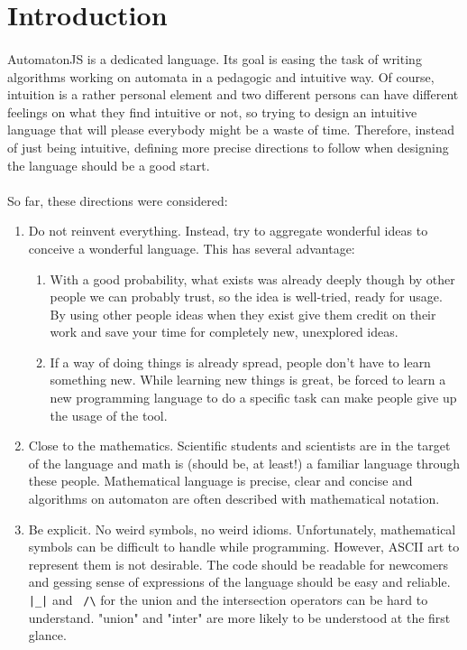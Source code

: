 \documentclass{article}
\begin{document}
\begin{sloppypar}
\section*{ Introduction}


\paragraph{}
AutomatonJS is a dedicated language. Its goal is easing the task of writing algorithms working on automata in a pedagogic and intuitive way. Of course, intuition is a rather personal element and two different persons can have different feelings on what they find intuitive or not, so trying to design an intuitive language that will please everybody might be a waste of time. Therefore, instead of just being intuitive, defining more precise directions to follow when designing the language should be a good start.

   
\paragraph{}
So far, these directions were considered:
    
\begin{enumerate}
	\item{ Do not reinvent everything. Instead, try to aggregate wonderful ideas to conceive a wonderful language. This has several advantage:
\begin{enumerate}
	\item{ With a good probability, what exists was already deeply though by other people we can probably trust, so the idea is well-tried, ready for usage. By using other people ideas when they exist give them credit on their work and save your time for completely new, unexplored ideas.}
	\item{ If a way of doing things is already spread, people don't have to learn something new. While learning new things is great, be forced to learn a new programming language to do a specific task can make people give up the usage of the tool.}
\end{enumerate}
}
	\item{ Close to the mathematics. Scientific students and scientists are in the target of the language and math is (should be, at least!) a familiar language through these people. Mathematical language is precise, clear and concise and algorithms on automaton are often described with mathematical notation.}
	\item{ Be explicit. No weird symbols, no weird idioms. Unfortunately, mathematical symbols can be difficult to handle while programming. However, ASCII art to represent them is not desirable. The code should be readable for newcomers and gessing sense of expressions of the language should be easy and reliable. \lstinline!|_|! and \lstinline! /\! for the union and the intersection operators can be hard to understand. "union" and "inter" are more likely to be understood at the first glance.}
\end{enumerate}


\end{sloppypar}
\end{document}
